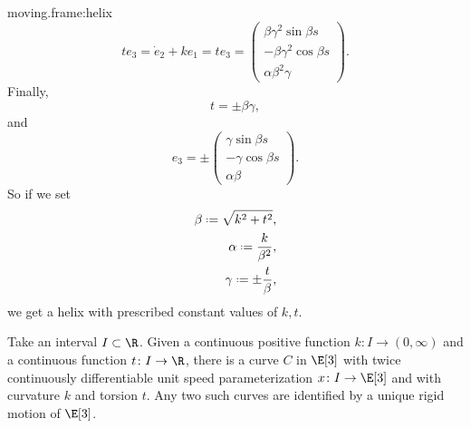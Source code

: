 \begin{answer}{moving.frame:helix}
\[te_3=\dot{e}_2+ke_1=te_3
=
\begin{pmatrix}
\beta\gamma^2\sin \beta s\\
-\beta\gamma^2\cos \beta s\\
\alpha\beta^2\gamma
\end{pmatrix}.
\]
Finally,
\[
t=\pm\beta\gamma,
\]
and
\[
e_3=
\pm
\begin{pmatrix}
\gamma\sin \beta s\\
-\gamma\cos \beta s\\
\alpha\beta
\end{pmatrix}.
\]
So if we set 
\begin{align*}
\beta\defeq\sqrt{k^2+t^2},\\
\alpha\defeq\frac{k}{\beta^2},\\
\gamma\defeq\pm\frac{t}{\beta},
\end{align*}
we get a helix with prescribed constant values of \(k,t\).
\end{answer}
\begin{theorem}
Take an interval \(I \subset \R\).
Given a continuous positive function \(k \colon I \to (0,\infty)\) and a continuous function \(t \colon I \to \R\), there is a curve \(C\) in \(\E[3]\) with twice continuously differentiable unit speed parameterization \(x \colon I \to \E[3]\) and with curvature \(k\) and torsion \(t\).
Any two such curves are identified by a unique rigid motion of \(\E[3]\).
\end{theorem}
